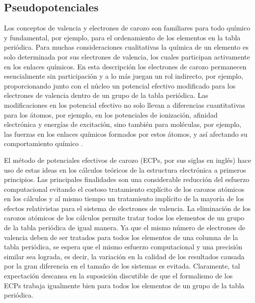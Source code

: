 \subsection{Pseudopotenciales}
Los conceptos de valencia y electrones de carozo son familiares para
todo qu\'imico y fundamental, por ejemplo, para el ordenamiento de 
los elementos en la tabla peri\'odica. Para muchas consideraciones
cualitativas la qu\'imica de un elemento es solo determinada por sus
electrones de valencia, los cuales participan activamente en los 
enlaces qu\'imicos. En esta descripci\'on los electrones de carozo 
permanecen esencialmente sin participaci\'on y a lo m\'as juegan un 
rol indirecto, por ejemplo, proporcionando junto con el n\'ucleo un 
potencial efectivo modificado para los electrones de valencia dentro
de un grupo de la tabla peri\'odica. Las modificaciones en los 
potencial efectivo no solo llevan a diferencias cuantitativas para 
los \'atomos, por ejemplo, en los potenciales de ionizaci\'on, 
afinidad electr\'onica y energ\'ias de excitaci\'on, sino tambi\'en 
para mol\'eculas, por ejemplo, las fuerzas en los enlaces qu\'imicos 
formados por estos \'atomos, y as\'i afectando su comportamiento 
qu\'imico \citep{Dolg2012}.

El m\'etodo de potenciales efectivos de carozo (ECPs, por sus siglas 
en ingl\'es) hace uso de estas ideas en los c\'alculos te\'oricos de 
la estructura electr\'onica a primeros principios. Las principales 
finalidades son una considerable reducci\'on del esfuerzo 
computacional evitando el costoso tratamiento expl\'icito de los 
carozos at\'omicos en los c\'alculos y al mismo tiempo un tratamiento
impl\'icito de la mayor\'ia de los efectos relativistas para el 
sistema de electrones de valencia. La eliminaci\'on de los carozos
at\'omicos de los c\'alculos permite tratar todos los elementos de un
grupo de la tabla peri\'odica de igual manera. Ya que el mismo 
n\'umero de electrones de valencia deben de ser tratados para todos
los elementos de una columna de la tabla peri\'odica, se espera que
el mismo esfuerzo computacional y una precisi\'on similar sea lograda,
es decir, la variaci\'on en la calidad de los resultados causada por la 
gran diferencia en el tama\~no de los sistemas es evitada. 
Claramente, tal expectaci\'on descansa en la suposici\'on discutible 
de que el formalismo de los ECPs trabaja igualmente bien para todos los 
elementos de un grupo de la tabla peri\'odica. 

